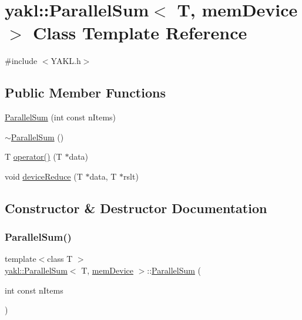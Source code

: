\hypertarget{classyakl_1_1ParallelSum_3_01T_00_01memDevice_01_4}{}\section{yakl\+:\+:Parallel\+Sum$<$ T, mem\+Device $>$ Class Template Reference}
\label{classyakl_1_1ParallelSum_3_01T_00_01memDevice_01_4}


{\ttfamily \#include $<$Y\+A\+K\+L.\+h$>$}

\subsection*{Public Member Functions}
\begin{DoxyCompactItemize}
\item 
\hyperlink{classyakl_1_1ParallelSum_3_01T_00_01memDevice_01_4_ab5eec65f9e4714eba27e018db26d30c9}{Parallel\+Sum} (int const n\+Items)
\item 
\hyperlink{classyakl_1_1ParallelSum_3_01T_00_01memDevice_01_4_a8f8e427629815ea8cdd1464dcd48648a}{$\sim$\+Parallel\+Sum} ()
\item 
T \hyperlink{classyakl_1_1ParallelSum_3_01T_00_01memDevice_01_4_ac1f128e9b41ed4993ff2d5889af1b1f2}{operator()} (T $\ast$data)
\item 
void \hyperlink{classyakl_1_1ParallelSum_3_01T_00_01memDevice_01_4_a7db2870334f8252762d24d0da60e69fa}{device\+Reduce} (T $\ast$data, T $\ast$rslt)
\end{DoxyCompactItemize}


\subsection{Constructor \& Destructor Documentation}
\mbox{\label{classyakl_1_1ParallelSum_3_01T_00_01memDevice_01_4_ab5eec65f9e4714eba27e018db26d30c9}} 
\subsubsection{\texorpdfstring{Parallel\+Sum()}{ParallelSum()}}
{\footnotesize\ttfamily template$<$class T $>$ \\
\hyperlink{classyakl_1_1ParallelSum}{yakl\+::\+Parallel\+Sum}$<$ T, \hyperlink{namespaceyakl_ac3c32aec58c61e7f870081477ceee883}{mem\+Device} $>$\+::\hyperlink{classyakl_1_1ParallelSum}{Parallel\+Sum} (\begin{DoxyParamCaption}\item[{int const}]{n\+Items }\end{DoxyParamCaption})\hspace{0.3cm}{\ttfamily [inline]}}

